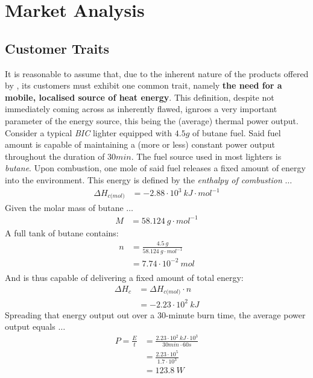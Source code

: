\section{Market Analysis}
\subsection{Customer Traits}
It is reasonable to assume that, due to the inherent nature of the products offered by \fw, its customers must
exhibit one common trait, namely \textbf{the need for a mobile, localised source of heat energy}.
This definition, despite not immediately coming across as inherently flawed, ignroes a very important parameter of the
energy source, this being the (average) thermal power output. \\[\baselineskip]
Consider a typical \textit{BIC} lighter equipped with $4.5g$ of butane fuel. Said fuel amount is capable of maintaining
a (more or less) constant power output throughout the duration of $30min$.
The fuel source used in most lighters is \textit{butane}. Upon combustion, one mole of said fuel
releases a fixed amount of energy into the environment. This energy is defined by the \textit{enthalpy of combustion} $\dots$
\begin{align*}
	\Delta H_{c\textit{(mol)}} &= -2.88 \cdot 10^3 \: kJ \cdot mol^{-1}
\end{align*}
Given the molar mass of butane $\dots$
\begin{align*}
	M &= 58.124 \: g \cdot mol^{-1}
\end{align*}
A full tank of butane contains:
\begin{align*}
	n &= \frac{4.5 \: g}{58.124 \: g \cdot mol^{-1}} \\
	  &= 7.74 \cdot 10^{-2} \: mol \\
\end{align*}
And is thus capable of delivering a fixed amount of total energy:
\begin{align*}
	\Delta H_c &= \Delta H_{c\textit{(mol)}} \cdot n \\
		   &= -2.23 \cdot 10^2 \: kJ
\end{align*}
Spreading that energy output out over a $30$-minute burn time, the average power output equals $\dots$
\begin{align*}
	P = \frac{E}{t} &= \frac{2.23 \cdot 10^2 \: kJ \cdot 10^3}{30min \cdot 60s} \\
			&= \frac{2.23 \cdot 10^5}{1.7 \cdot 10^3} \\
			&= 123.8 \: W
\end{align*}
